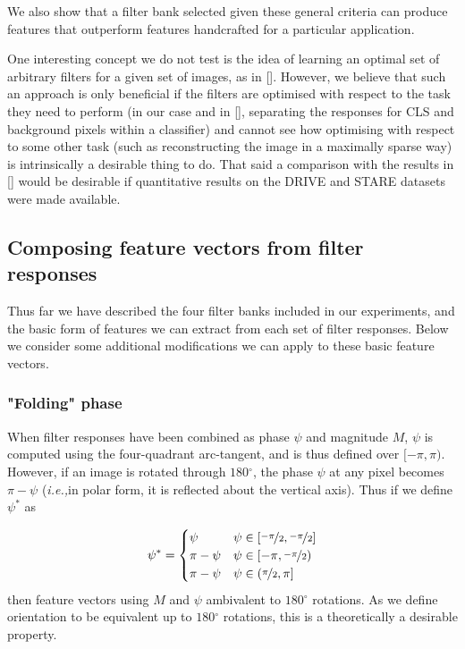 \documentclass{IEEEtran}
\def\ie{\emph{i.e.,}}
\def\deg{\ensuremath{^\circ}}
\begin{document}
We also show that a filter bank selected given these general criteria can produce features that outperform features handcrafted for a particular application.

One interesting concept we do not test is the idea of learning an optimal set of arbitrary filters for a given set of images, as in []. However, we believe that such an approach is only beneficial if the filters are optimised with respect to the task they need to perform (in our case and in [], separating the responses for CLS and background pixels within a classifier) and cannot see how optimising with respect to some other task (such as reconstructing the image in a maximally sparse way) is intrinsically a desirable thing to do. That said a comparison with the results in [] would be desirable if quantitative results on the DRIVE and STARE datasets were made available.

\subsection{Composing feature vectors from filter responses}
\label{s:composing_features}
Thus far we have described the four filter banks included in our experiments, and the basic form of features we can extract from each set of filter responses. Below we consider some additional modifications we can apply to these basic feature vectors.

\subsubsection{"Folding" phase}
\label{s:composing_features_complex}
When filter responses have been combined as phase $\psi$ and magnitude $M$, $\psi$ is computed using the four-quadrant arc-tangent, and is thus defined over $[-\pi, \pi)$. However, if an image is rotated through $180\deg$, the phase $\psi$ at any pixel becomes $\pi - \psi$ (\ie in polar form, it is reflected about the vertical axis). Thus if we define $\psi^*$ as

\begin{equation}
\psi^* =
\begin{cases}
      \psi          & \psi \in [\nicefrac{-\pi}{2}, \nicefrac{-\pi}{2}] \\
      \pi - \psi    & \psi \in [-\pi, \nicefrac{-\pi}{2}) \\
      \pi - \psi    & \psi \in (\nicefrac{\pi}{2}, \pi]
   \end{cases}
\label{e:folding_phase}
\end{equation}
%
then feature vectors using $M$ and $\psi$ ambivalent to $180\deg$ rotations. As we define orientation to be equivalent up to $180\deg$ rotations, this is a theoretically a desirable property.
\end{document}
